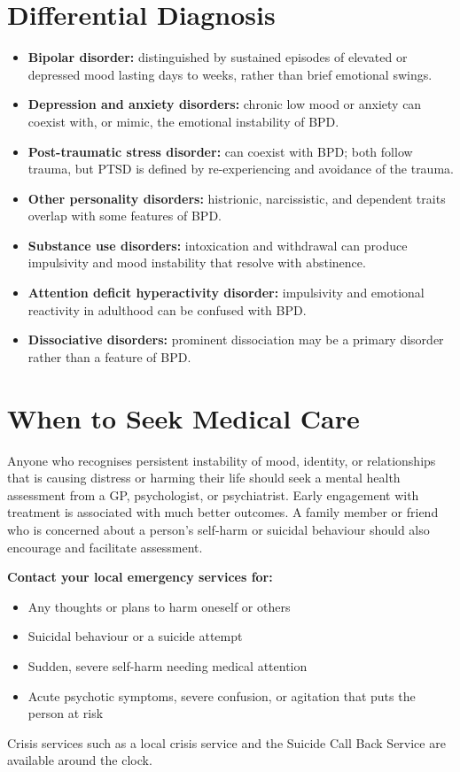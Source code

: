 \section*{Differential Diagnosis}
\begin{itemize}
    \item \textbf{Bipolar disorder:} distinguished by sustained episodes of elevated or depressed mood lasting days to weeks, rather than brief emotional swings.
    \item \textbf{Depression and anxiety disorders:} chronic low mood or anxiety can coexist with, or mimic, the emotional instability of BPD.
    \item \textbf{Post-traumatic stress disorder:} can coexist with BPD; both follow trauma, but PTSD is defined by re-experiencing and avoidance of the trauma.
    \item \textbf{Other personality disorders:} histrionic, narcissistic, and dependent traits overlap with some features of BPD.
    \item \textbf{Substance use disorders:} intoxication and withdrawal can produce impulsivity and mood instability that resolve with abstinence.
    \item \textbf{Attention deficit hyperactivity disorder:} impulsivity and emotional reactivity in adulthood can be confused with BPD.
    \item \textbf{Dissociative disorders:} prominent dissociation may be a primary disorder rather than a feature of BPD.
\end{itemize}

\section*{When to Seek Medical Care}
Anyone who recognises persistent instability of mood, identity, or relationships that is causing distress or harming their life should seek a mental health assessment from a GP, psychologist, or psychiatrist. Early engagement with treatment is associated with much better outcomes. A family member or friend who is concerned about a person's self-harm or suicidal behaviour should also encourage and facilitate assessment.

\textbf{Contact your local emergency services for:}
\begin{itemize}
    \item Any thoughts or plans to harm oneself or others
    \item Suicidal behaviour or a suicide attempt
    \item Sudden, severe self-harm needing medical attention
    \item Acute psychotic symptoms, severe confusion, or agitation that puts the person at risk
\end{itemize}
Crisis services such as a local crisis service and the Suicide Call Back Service are available around the clock.

